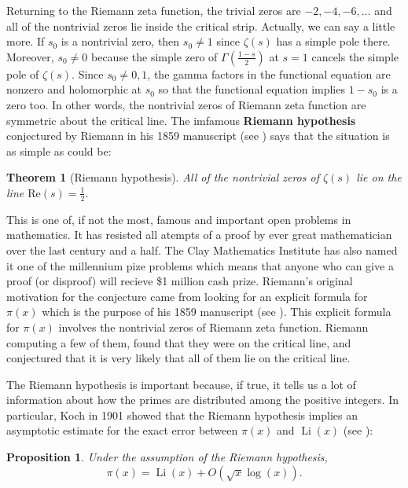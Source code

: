 \documentclass[12pt]{book}
\newtheorem{theorem}{Theorem}[section]
\newtheorem{proposition}{Proposition}[section]
\theoremstyle{definition}\newframedtheorem{method}{Method}
\newcommand{\z}{\zeta}
\newcommand{\G}{\Gamma}
\newcommand{\<}{\langle}
\renewcommand{\>}{\rangle}
\DeclareMathOperator{\Li}{\mathrm{Li}}
\renewcommand{\Re}{\mathrm{Re}}
\begin{document}
    Returning to the Riemann zeta function, the trivial zeros are $-2,-4,-6,\ldots$ and all of the nontrivial zeros lie inside the critical strip. Actually, we can say a little more. If $s_{0}$ is a nontrivial zero, then $s_{0} \neq 1$ since $\z(s)$ has a simple pole there. Moreover, $s_{0} \neq 0$ because the simple zero of $\G\left(\frac{1-s}{2}\right)$ at $s = 1$ cancels the simple pole of $\z(s)$. Since $s_{0} \neq 0,1$, the gamma factors in the functional equation are nonzero and holomorphic at $s_{0}$ so that the functional equation implies $1-s_{0}$ is a zero too. In other words, the nontrivial zeros of Riemann zeta function are symmetric about the critical line. The imfamous \textbf{Riemann hypothesis} conjectured by Riemann in his 1859 manuscript (see \cite{riemann1859ueber}) says that the situation is as simple as could be:

    \begin{theorem}[Riemann hypothesis]
      All of the nontrivial zeros of $\z(s)$ lie on the line $\Re(s) = \frac{1}{2}$.
    \end{theorem}

    This is one of, if not the most, famous and important open problems in mathematics. It has resisted all atempts of a proof by ever great mathematician over the last century and a half. The Clay Mathematics Institute has also named it one of the millennium pize problems which means that anyone who can give a proof (or disproof) will recieve \$1 million cash prize. Riemann's original motivation for the conjecture came from looking for an explicit formula for $\pi(x)$ which is the purpose of his 1859 manuscript (see \cite{riemann1859ueber}). This explicit formula for $\pi(x)$ involves the nontrivial zeros of Riemann zeta function. Riemann computing a few of them, found that they were on the critical line, and conjectured that it is very likely that all of them lie on the critical line.

    The Riemann hypothesis is important because, if true, it tells us a lot of information about how the primes are distributed among the positive integers. In particular, Koch in 1901 showed that the Riemann hypothesis implies an asymptotic estimate for the exact error between $\pi(x)$ and $\Li(x)$ (see \cite{von1901distribution}):

    \begin{proposition}
      Under the assumption of the Riemann hypothesis,
      \[
        \pi(x) = \Li(x)+O(\sqrt{x}\log(x)).
      \]
    \end{proposition}
\end{document}
